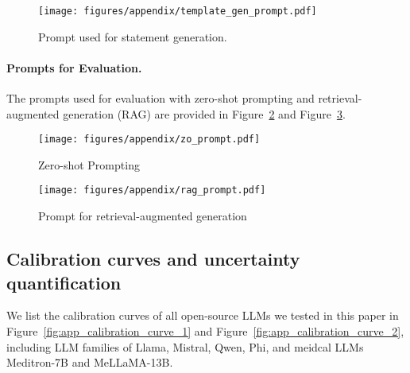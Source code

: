 \begin{figure}[ht]
    \centering
    \texttt{[image: figures/appendix/template\_gen\_prompt.pdf]}
    \caption{Prompt used for statement generation.}
    \label{fig:template_gen_prompt}
\end{figure}


\paragraph{Prompts for Evaluation.}
The prompts used for evaluation with zero-shot prompting and retrieval-augmented generation (RAG) are provided in Figure~\ref{fig:zo_prompt} and Figure~\ref{fig:rag_prompt}.

\begin{figure}[ht]
    \centering
    \texttt{[image: figures/appendix/zo\_prompt.pdf]}
    \caption{Zero-shot Prompting}
    \label{fig:zo_prompt}
\end{figure}

\begin{figure}[ht]
    \centering
    \texttt{[image: figures/appendix/rag\_prompt.pdf]}
    \caption{Prompt for retrieval-augmented generation}
    \label{fig:rag_prompt}
\end{figure}


\subsection{Calibration curves and uncertainty quantification}
\label{app:calibration}
We list the calibration curves of all open-source LLMs we tested in this paper in Figure~\ref{fig:app_calibration_curve_1} and Figure~\ref{fig:app_calibration_curve_2}, including LLM families of Llama, Mistral, Qwen, Phi, and meidcal LLMs Meditron-7B and MeLLaMA-13B.

